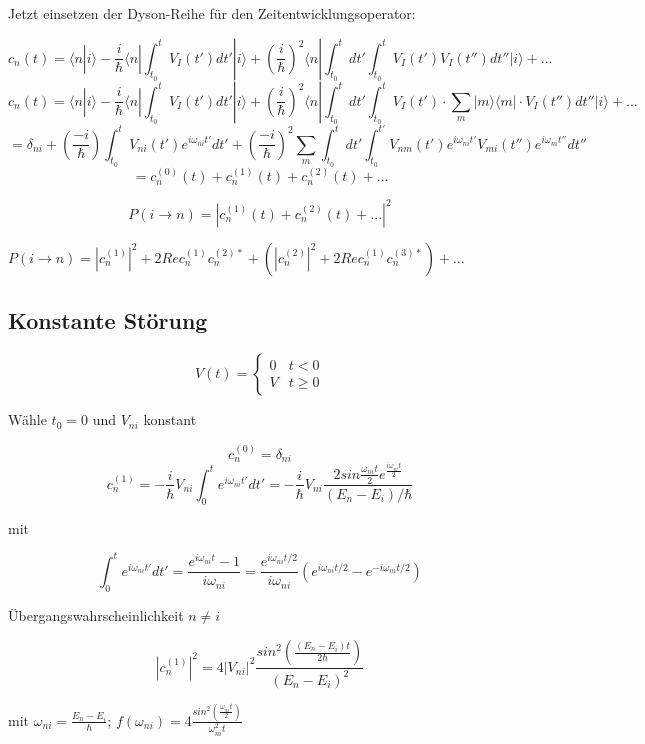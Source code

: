 Jetzt einsetzen der Dyson-Reihe für den Zeitentwicklungsoperator:

\[ c_n(t) = \langle n|i\rangle - \frac{i}{\hbar}\langle n |\int_{t_0}^t V_I(t')dt'|i\rangle + (\frac{i}{\hbar})^2\langle n |\int_{t_0}^t dt'\int_{t_0}^t V_I(t')V_I(t'')dt'' |i\rangle +...\]
\[ c_n(t) = \langle n|i\rangle - \frac{i}{\hbar}\langle n |\int_{t_0}^t V_I(t')dt'|i\rangle + (\frac{i}{\hbar})^2\langle n |\int_{t_0}^t dt'\int_{t_0}^t V_I(t')\cdot\sum_m |m\rangle \langle m|\cdot V_I(t'')dt'' |i\rangle +...\]
\[ = \delta_{ni}+(\frac{-i}{\hbar})\int_{t_0}^t V_{ni}(t')e^{i\omega_{ni}t'}dt' + (\frac{-i}{\hbar})^2\sum_m\int_{t_0}^tdt'\int_{t_0}^{t'} V_{nm}(t')e^{i\omega_{ni}t'} V_{mi}(t'')e^{i\omega_{ni}t''} dt''\]
\[ = c_n^{(0)}(t)+c_n^{(1)}(t)+c_n^{(2)}(t)+...\]



\[\boxed{P(i\rightarrow n) = | c_n^{(1)}(t)+c_n^{(2)}(t)+...|^2}\]


\(P(i\rightarrow n) = |c_n^{(1)}|^2 + 2Re c_n^{(1)} c_n^{(2)*}+(|c_n^{(2)}|^2 + 2Re c_n^{(1)} c_n^{(3)*})+...\)



\subsection{Konstante Störung}

\[V(t) = \begin{cases}
  0  & t<0\\
  V& t\geq 0
\end{cases}\]

Wähle \(t_0 = 0\) und \(V_{ni}\) konstant

\[ c^{(0)}_n = \delta_{ni}\]
\[ c^{(1)}_n = -\frac{i}{\hbar} V_{ni}\int_0^t e^{i\omega_{ni}t'}dt'=-\frac{i}{\hbar}V_{ni}\frac{2sin\frac{\omega_{ni}t}{2}e^{\frac{i\omega_{ni}t}{2}}}{(E_n-E_i)/\hbar}\]

mit

\[\int_0^t e^{i\omega_{ni}t'}dt' = \frac{e^{i\omega_{ni}t}-1}{i\omega_{ni}}=\frac{e^{i\omega_{ni}t/2}}{i\omega_{ni}}(e^{i\omega_{ni}t/2}-e^{-i\omega_{ni}t/2})\]

Übergangswahrscheinlichkeit \(n\neq i\)

\[ |c^{(1)}_n|^2 = 4|V_{ni}|^2 \frac{sin^2\left(\frac{(E_n-E_i)t}{2\hbar}\right)}{(E_n-E_i)^2} \]


mit \(\omega_{ni} =  \frac{E_n-E_i}{\hbar}\); \(f(\omega_{ni}) = 4\frac{sin^2\left(\frac{\omega_{ni} t}{2}\right)}{\omega^2_{ni}t}\)



